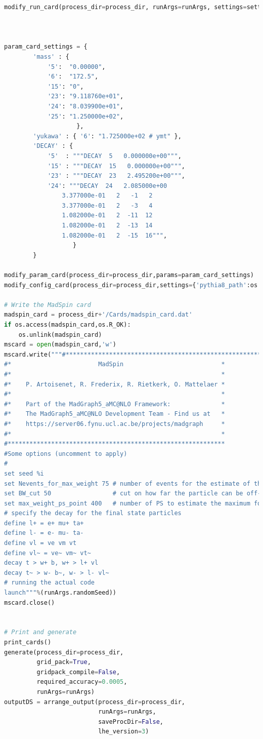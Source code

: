 \documentclass[NOTE, REPORT=true, atlasdraft=true, USenglish]{atlasdoc}
\begin{document}
\begin{lstlisting}[language=python, caption=$tqZ$ job option python script]
modify_run_card(process_dir=process_dir, runArgs=runArgs, settings=settings)



param_card_settings = {
        'mass' : {
            '5':  "0.00000",
            '6':  "172.5",
            '15': "0",
            '23': "9.118760e+01",
            '24': "8.039900e+01",
            '25': "1.250000e+02",
                    },
        'yukawa' : { '6': "1.725000e+02 # ymt" },
        'DECAY' : {
            '5'  : """DECAY  5   0.000000e+00""",
            '15' : """DECAY  15   0.000000e+00""",
            '23' : """DECAY  23   2.495200e+00""",
            '24': """DECAY  24   2.085000e+00
                3.377000e-01   2   -1   2
                3.377000e-01   2   -3   4
                1.082000e-01   2  -11  12
                1.082000e-01   2  -13  14
                1.082000e-01   2  -15  16""",
                   }
        }

modify_param_card(process_dir=process_dir,params=param_card_settings)
modify_config_card(process_dir=process_dir,settings={'pythia8_path':os.getenv("PY8PATH")})

# Write the MadSpin card
madspin_card = process_dir+'/Cards/madspin_card.dat'
if os.access(madspin_card,os.R_OK):
    os.unlink(madspin_card)
mscard = open(madspin_card,'w')
mscard.write("""#************************************************************
#*                        MadSpin                           *
#*                                                          *
#*    P. Artoisenet, R. Frederix, R. Rietkerk, O. Mattelaer *
#*                                                          *
#*    Part of the MadGraph5_aMC@NLO Framework:              *
#*    The MadGraph5_aMC@NLO Development Team - Find us at   *
#*    https://server06.fynu.ucl.ac.be/projects/madgraph     *
#*                                                          *
#************************************************************
#Some options (uncomment to apply)
#
set seed %i
set Nevents_for_max_weight 75 # number of events for the estimate of the max. weight
set BW_cut 50                 # cut on how far the particle can be off-shell
set max_weight_ps_point 400   # number of PS to estimate the maximum for each event
# specify the decay for the final state particles
define l+ = e+ mu+ ta+
define l- = e- mu- ta-
define vl = ve vm vt
define vl~ = ve~ vm~ vt~
decay t > w+ b, w+ > l+ vl
decay t~ > w- b~, w- > l- vl~
# running the actual code
launch"""%(runArgs.randomSeed))
mscard.close()


# Print and generate
print_cards()
generate(process_dir=process_dir,
         grid_pack=True,
         gridpack_compile=False,
         required_accuracy=0.0005,
         runArgs=runArgs)
outputDS = arrange_output(process_dir=process_dir,
                          runArgs=runArgs,
                          saveProcDir=False,
                          lhe_version=3)



\end{lstlisting}
\end{document}
